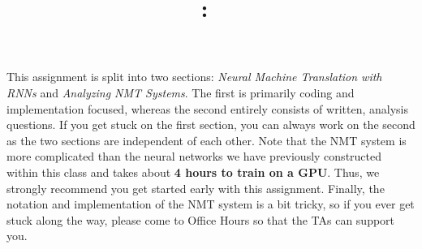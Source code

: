 \documentclass[answers]{exam}
\title{
\vspace{-1in}
\textmd{\textbf{\hmwkClass:\ \hmwkTitle} \\ \hmwkAuthorName}
}
\author{}
\date{}
\begin{document}
\maketitle
\vspace{-.5in}


This assignment is split into two sections: \textit{Neural Machine Translation with RNNs} and \textit{Analyzing NMT Systems}. The first is primarily coding and implementation focused, whereas the second entirely consists of written, analysis questions. If you get stuck on the first section, you can always work on the second as the two sections are independent of each other. Note that the NMT system is more complicated than the neural networks we have previously constructed within this class and takes about \textbf{4 hours to train on a GPU}. Thus, we strongly recommend you get started early with this assignment. Finally, the notation and implementation of the NMT system is a bit tricky, so if you ever get stuck along the way, please come to Office Hours so that the TAs can support you. \newline

\begin{questions}
    
    
\end{questions}


\end{document}
